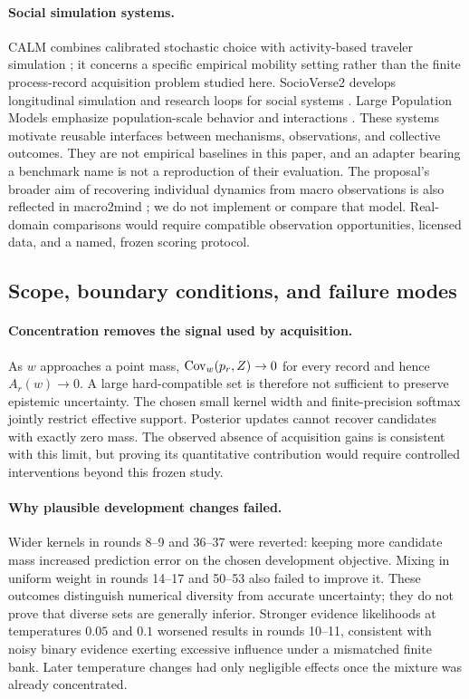 \paragraph{Social simulation systems.}
CALM combines calibrated stochastic choice with activity-based traveler simulation \citep{cheng2026}; it concerns a specific empirical mobility setting rather than the finite process-record acquisition problem studied here. SocioVerse2 develops longitudinal simulation and research loops for social systems \citep{zhang2026}. Large Population Models emphasize population-scale behavior and interactions \citep{chopra2025}. These systems motivate reusable interfaces between mechanisms, observations, and collective outcomes. They are not empirical baselines in this paper, and an adapter bearing a benchmark name is not a reproduction of their evaluation. The proposal's broader aim of recovering individual dynamics from macro observations is also reflected in macro2mind \citep{macro2mind2026}; we do not implement or compare that model. Real-domain comparisons would require compatible observation opportunities, licensed data, and a named, frozen scoring protocol.

\subsection{Scope, boundary conditions, and failure modes}
\label{sec:boundaries}
\paragraph{Concentration removes the signal used by acquisition.}
As $w$ approaches a point mass, $\operatorname{Cov}_w(p_r,Z)\to0$ for every record and hence $A_r(w)\to0$. A large hard-compatible set is therefore not sufficient to preserve epistemic uncertainty. The chosen small kernel width and finite-precision softmax jointly restrict effective support. Posterior updates cannot recover candidates with exactly zero mass. The observed absence of acquisition gains is consistent with this limit, but proving its quantitative contribution would require controlled interventions beyond this frozen study.

\paragraph{Why plausible development changes failed.}
Wider kernels in rounds 8--9 and 36--37 were reverted: keeping more candidate mass increased prediction error on the chosen development objective. Mixing in uniform weight in rounds 14--17 and 50--53 also failed to improve it. These outcomes distinguish numerical diversity from accurate uncertainty; they do not prove that diverse sets are generally inferior. Stronger evidence likelihoods at temperatures $0.05$ and $0.1$ worsened results in rounds 10--11, consistent with noisy binary evidence exerting excessive influence under a mismatched finite bank. Later temperature changes had only negligible effects once the mixture was already concentrated.

